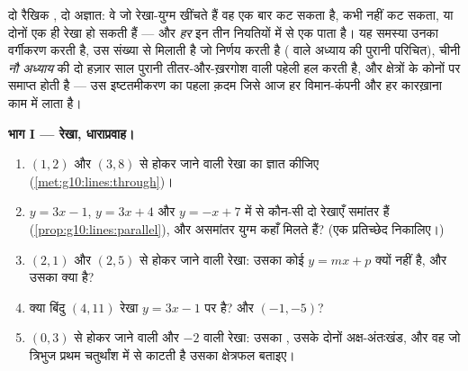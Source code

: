 \begin{problem}
\label{pb:g10:lines:1}
दो रैखिक , दो अज्ञात: वे जो रेखा-युग्म खींचते हैं वह एक बार कट सकता
है, कभी नहीं कट सकता, या दोनों एक ही रेखा हो सकती हैं --- और \emph{हर}  इन तीन नियतियों में से एक पाता है। यह समस्या उनका वर्गीकरण करती है,
उस संख्या से मिलाती है जो निर्णय करती है ( वाले अध्याय की पुरानी
परिचित), चीनी \emph{नौ अध्याय} की दो हज़ार साल पुरानी तीतर-और-ख़रगोश वाली
पहेली हल करती है, और क्षेत्रों के कोनों पर समाप्त होती है --- उस इष्टतमीकरण
का पहला क़दम जिसे आज हर विमान-कंपनी और हर कारख़ाना काम में लाता है।

\medskip
\noindent\textbf{भाग I --- रेखा, धाराप्रवाह।}
\begin{enumerate}
  \item $(1, 2)$ और $(3, 8)$ से होकर जाने वाली रेखा का  ज्ञात
        कीजिए (\cref{met:g10:lines:through})।
  \item $y = 3x - 1$, $y = 3x + 4$ और $y = -x + 7$ में से कौन-सी दो रेखाएँ समांतर हैं (\cref{prop:g10:lines:parallel}),
        और असमांतर युग्म कहाँ मिलते हैं? (एक प्रतिच्छेद निकालिए।)
  \item $(2, 1)$ और $(2, 5)$ से होकर जाने वाली रेखा: उसका कोई 
        $y = mx + p$ क्यों नहीं है, और उसका  क्या है?
  \item क्या बिंदु $(4, 11)$ रेखा $y = 3x - 1$ पर है? और $(-1, -5)$?
  \item $(0, 3)$ से होकर जाने वाली और  $-2$ वाली रेखा: उसका ,
        उसके दोनों अक्ष-अंतःखंड, और वह जो त्रिभुज प्रथम चतुर्थांश में से
        काटती है उसका क्षेत्रफल बताइए।
\end{enumerate}


\end{problem}
